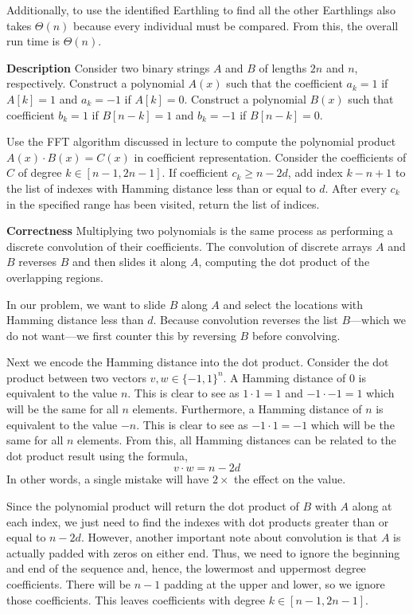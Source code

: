 \documentclass[12pt,twoside]{article}
\begin{document}
\begin{problems}
\begin{problemparts}
Additionally, to use the identified Earthling to find all the other Earthlings 
also takes $\Theta(n)$ because every individual must be compared. From this, the
overall run time is $\Theta(n)$.

\end{problemparts}

\newpage
\problem  %

\textbf{Description} Consider two binary strings $A$ and $B$ of lengths $2n$ 
and $n$, respectively. Construct a polynomial $A(x)$ such that the coefficient
$a_k = 1$ if $A[k] = 1$ and $a_k = -1$ if $A[k] = 0$. Construct a polynomial
$B(x)$ such that coefficient $b_k = 1$ if $B[n - k] = 1$ and $b_k = -1$ if
$B[n - k] = 0$. 

Use the FFT algorithm discussed in lecture to compute the polynomial product 
$A(x) \cdot B(x) = C(x)$ in coefficient representation. Consider the coefficients 
of $C$ of degree $k \in [n - 1, 2n - 1]$. If coefficient $c_k \geq n - 2 d$, 
add index $k - n + 1$ to the list of indexes with Hamming distance less than or 
equal to $d$. After every $c_k$ in the specified range has been visited, return 
the list of indices.

\textbf{Correctness} Multiplying two polynomials is the same process as
performing a discrete convolution of their coefficients. The convolution of 
discrete arrays $A$ and $B$ reverses $B$ and then slides it along $A$, computing
the dot product of the overlapping regions. 

In our problem, we want to slide $B$ along $A$ and select the locations with 
Hamming distance less than $d$. Because convolution reverses the list $B$---which
we do not want---we first counter this by reversing $B$ before convolving. 

Next we encode the Hamming distance into the dot product. Consider the dot product
between two vectors $v, w \in \{-1, 1\}^n$. A Hamming distance of 
$0$ is equivalent to the value $n$. This is clear to see as $1 \cdot 1 = 1$
and $-1 \cdot -1 = 1$ which will be the same for all $n$ elements.
Furthermore, a Hamming distance of $n$ is equivalent to the value $-n$. This
is clear to see as $-1 \cdot 1 = -1$ which will be the same for all $n$ elements.
From this, all Hamming distances can be related to the dot product result using the
formula,
$$ v \cdot w = n - 2d $$
In other words, a single mistake will have $2 \times$ the effect on the value.

Since the polynomial product will return the dot product of $B$ with $A$ along at
each index, we just need to find the indexes with dot products greater than or 
equal to $n - 2d$. However, another important note about convolution is that $A$
is actually padded with zeros on either end. Thus, we need to ignore the beginning
and end of the sequence and, hence, the lowermost and uppermost degree coefficients.
There will be $n - 1$ padding at the upper and lower, so we ignore those 
coefficients. This leaves coefficients with degree $k \in [n - 1, 2n - 1]$.


\end{problems}
\end{document}
